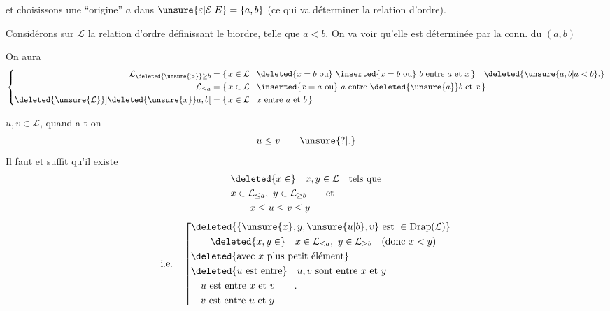 et choisissons une ``origine'' $a$ dans $\unsure{\varepsilon|\mathcal E|E}=\{a,b\}$ (ce qui va déterminer la relation d'ordre).

  Considérons sur $\mathcal L$ la relation d'ordre définissant le biordre, telle que $a<b$. On va voir qu'elle est  déterminée par la conn. du  $(a,b)$

On aura 
\[
\left\{\begin{aligned}
\mathcal L_{\deleted{\unsure{>}}\geq b}&=\{\,x\in\mathcal L\mid\deleted{x=b\text{ ou}}\ \inserted{x=b\text{ ou}}\ b\text{ entre }a\text{ et }x\,\}\quad\deleted{\unsure{a,b|a<b}.}\\
\mathcal L_{\leq a}&=\{\,x\in\mathcal L\mid\inserted{x=a\text{ ou}}\ a\text{ entre }\deleted{\unsure{a}}b\text{ et }x\,\}\\
\deleted{\unsure{\mathcal L}}\mathopen{]}\deleted{\unsure{x}}a,b\mathclose{[}&=\{\,x\in\mathcal L\mid x\text{ entre }a\text{ et }b\,\}
\end{aligned}\right.
\]

 $u,v\in\mathcal L$, quand a-t-on
\[
u\leq v\qquad\unsure{\mathord{?}|.}
\]
Il faut et suffit qu'il existe
\[
\begin{aligned}
&\deleted{x\in}\quad x,y\in\mathcal L\quad\text{tels que}\\
&x\in\mathcal L_{\leq a},\ y\in\mathcal L_{\geq b}\qquad\text{et}\\
&\hspace{2em}x\leq u\leq v\leq y
\end{aligned}
\]
\[
\text{i.e.}\quad
\left[\begin{aligned}
&\deleted{\{\unsure{x},y,\unsure{u|b},v\}\ \text{est }\in\mathrm{Drap}(\mathcal L)}\\
&\qquad\deleted{x,y\in}\quad x\in\mathcal L_{\leq a},\ y\in\mathcal L_{\geq b}\quad(\text{donc }x<y)\\
&\deleted{\text{avec }x\text{ plus petit élément}}\\
&\deleted{u\text{ est entre}}\quad u,v\text{ sont entre }x\text{ et }y\\
&\quad u\text{ est entre }x\text{ et }v\qquad.\\
&\quad v\text{ est entre }u\text{ et }y
\end{aligned}\right.
\]

